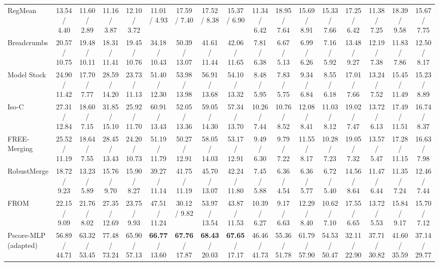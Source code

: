 \documentclass[journal,twoside,web]{ieeecolor}
\newcommand{\pub}[1]{{\color{gray}{\footnotesize{[{#1}]}}}}
\begin{document}
\begin{table}[!t]
{\begin{tabular}{l||ccc:c|ccc:c|ccc:c|ccc:c}
RegMean\pub{ICLR 2023} & 13.54 / 4.40 & 11.60 / 2.89 & 11.16 / 3.87 & 12.10 / 3.72 & 11.01 / 4.93 & 17.59 / 7.40 & 17.52 / 8.38 & 15.37 / 6.90 & 11.34 / 6.42 & 18.95 / 7.64 & 15.69 / 8.91 & 15.33 / 7.66 & 17.25 / 6.42 & 11.38 / 7.25 & 18.39 / 9.58 & 15.67 / 7.75 \\

Breadcrumbs\pub{ECCV 2024} & 20.57 / 10.75 & 19.48 / 10.11 & 18.31 / 11.41 & 19.45 / 10.76 & 34.18 / 10.43 & 50.39 / 13.07 & 41.61 / 11.44 & 42.06 / 11.65 & 7.81 / 6.38 & 6.67 / 5.13 & 6.99 / 6.26 & 7.16 / 5.92 & 13.48 / 9.27 & 12.19 / 7.38 & 11.83 / 7.86 & 12.50 / 8.17 \\


Model Stock\pub{ECCV 2024} & 24.90 / 11.42 & 17.70 / 7.77 & 28.59 / 14.20 & 23.73 / 11.13 & 51.40 / 12.30 & 53.98 / 13.98 & 56.91 / 13.68 & 54.10 / 13.32 & 8.48 / 5.95 & 7.83 / 5.75 & 9.34 / 6.84 & 8.55 / 6.18 & 17.01 / 7.66 & 13.24 / 7.52 & 15.45 / 11.49 & 15.23 / 8.89 \\

Iso-C\pub{ICML 2025} & 27.31 / 12.84 & 18.60 / 7.15 & 31.85 / 15.10 & 25.92 / 11.70 & 60.91 / 13.43 & 52.05 / 13.36 & 59.05 / 14.30 & 57.34 / 13.70 & 10.26 / 7.44 & 10.76 / 8.52 & 12.08 / 8.41 & 11.03 / 8.12 & 19.02 / 7.47 & 13.72 / 6.13 & 17.49 / 11.51 & 16.74 / 8.37 \\


FREE-Merging\pub{ICCV 2025} & 25.52 / 11.19 & 18.64 / 7.55 & 28.45 / 13.43 & 24.20 / 10.73 & 51.19 / 11.79 & 50.27 / 12.91 & 58.05 / 14.03 & 53.17 / 12.91 & 9.49 / 6.30 & 9.79 / 7.22 & 11.55 / 8.17 & 10.28 / 7.23 & 19.05 / 7.32 & 13.57 / 5.47 & 17.28 / 11.15 & 16.63 / 7.98 \\

RobustMerge\pub{NeurIPS 2025} & 18.72 / 9.23 & 13.23 / 5.89 & 15.76 / 9.70 & 15.90 / 8.27 & 39.27 / 11.14 & 41.75 / 11.19 & 45.70 / 13.07 & 42.24 / 11.80 & 7.45 / 5.88 & 6.36 / 4.54 & 6.36 / 5.77 & 6.72 / 5.40 & 14.56 / 8.64 & 11.47 / 6.44 & 11.35 / 7.24 & 12.46 / 7.44 \\


FROM\pub{AAAI 2026} & 22.15 / 9.09 & 21.76 / 8.02 & 27.35 / 12.69 & 23.75 / 9.93 & 47.51 / 11.24 & 30.12 / 9.82 & 53.97 / 13.54 & 43.87 / 11.53 & 10.39 / 6.27 & 9.17 / 6.63 & 12.29 / 8.40 & 10.62 / 7.10 & 17.55 / 6.65 & 13.72 / 5.53 & 15.84 / 9.17 & 15.70 / 7.12 \\

\hdashline
Pscore-MLP (adapted)\pub{TMI 2022} & 56.89 / 44.71 & 63.32 / 53.45 & 77.48 / 73.24 & 65.90 / 57.13 & \textbf{66.77} / 13.60 & \textbf{67.76} / 17.87 & \textbf{68.43} / 20.03 & \textbf{67.65} / 17.17 & 46.46 / 41.73 & 55.36 / 51.78 & 61.79 / 57.90 & 54.53 / 50.47 & 32.11 / 22.90 & 37.71 / 30.82 & 41.60 / 35.59 & 37.14 / 29.77 \\


\end{tabular}}
\end{table}
\end{document}

